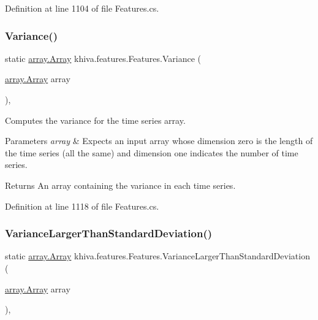 Definition at line 1104 of file Features.\+cs.

\mbox{\label{classkhiva_1_1features_1_1_features_a3f345f5e1ba5db83f4aae546bcc4688e}} 
\subsubsection{\texorpdfstring{Variance()}{Variance()}}
{\footnotesize\ttfamily static \mbox{\hyperlink{classkhiva_1_1array_1_1_array}{array.\+Array}} khiva.\+features.\+Features.\+Variance (\begin{DoxyParamCaption}\item[{\mbox{\hyperlink{classkhiva_1_1array_1_1_array}{array.\+Array}}}]{array }\end{DoxyParamCaption})\hspace{0.3cm}{\ttfamily [inline]}, {\ttfamily [static]}}



Computes the variance for the time series array. 


\begin{DoxyParams}{Parameters}
{\em array} & Expects an input array whose dimension zero is the length of the time series (all the same) and dimension one indicates the number of time series.\\
\hline
\end{DoxyParams}
\begin{DoxyReturn}{Returns}
An array containing the variance in each time series.
\end{DoxyReturn}


Definition at line 1118 of file Features.\+cs.

\mbox{\label{classkhiva_1_1features_1_1_features_a2714c653b8dfcd69ddef827c6ce6afd7}} 
\subsubsection{\texorpdfstring{Variance\+Larger\+Than\+Standard\+Deviation()}{VarianceLargerThanStandardDeviation()}}
{\footnotesize\ttfamily static \mbox{\hyperlink{classkhiva_1_1array_1_1_array}{array.\+Array}} khiva.\+features.\+Features.\+Variance\+Larger\+Than\+Standard\+Deviation (\begin{DoxyParamCaption}\item[{\mbox{\hyperlink{classkhiva_1_1array_1_1_array}{array.\+Array}}}]{array }\end{DoxyParamCaption})\hspace{0.3cm}{\ttfamily [inline]}, {\ttfamily [static]}}



